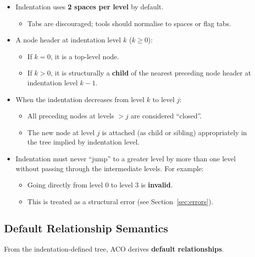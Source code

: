 \documentclass[11pt]{article}
\begin{document}
\begin{itemize}[leftmargin=2em]
  \item Indentation uses \textbf{2 spaces per level} by default.
  \begin{itemize}[leftmargin=1.5em]
    \item Tabs are discouraged; tools should normalise to spaces or flag tabs.
  \end{itemize}

  \item A node header at indentation level \(k\) (\(k \geq 0\)):
  \begin{itemize}[leftmargin=1.5em]
    \item If \(k = 0\), it is a top-level node.
    \item If \(k > 0\), it is structurally a \textbf{child} of the nearest preceding node header at indentation level \(k - 1\).
  \end{itemize}

  \item When the indentation decreases from level \(k\) to level \(j\):
  \begin{itemize}[leftmargin=1.5em]
    \item All preceding nodes at levels \(> j\) are considered ``closed''.
    \item The new node at level \(j\) is attached (as child or sibling) appropriately in the tree implied by indentation level.
  \end{itemize}

  \item Indentation must never ``jump'' to a greater level by more than one level without passing through the intermediate levels. For example:
  \begin{itemize}[leftmargin=1.5em]
    \item Going directly from level 0 to level 3 is \textbf{invalid}.
    \item This is treated as a structural error (see Section~\ref{sec:errors}).
  \end{itemize}
\end{itemize}

\subsection{Default Relationship Semantics}

From the indentation-defined tree, ACO derives \textbf{default relationships}.
\end{document}
